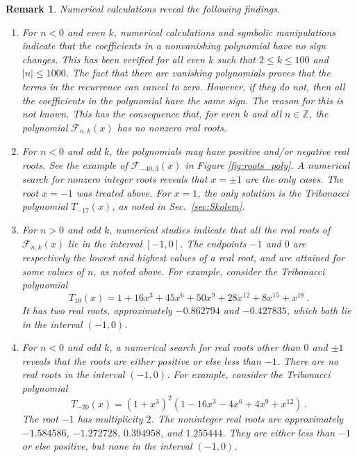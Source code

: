 \documentclass[review]{elsarticle}
\theoremstyle{plain}
\newtheorem{remark}[theorem]{Remark}
\begin{document}
\begin{remark}
  Numerical calculations reveal the following findings.
\begin{enumerate}
\item
  For $n<0$ and even $k$, numerical calculations and symbolic manipulations indicate that the coefficients in a nonvanishing polynomial have no sign changes.
  This has been verified for all even $k$ such that $2 \le k \le 100$ and $|n|\le1000$.
  The fact that there are vanishing polynomials proves that the terms in the recurrence can cancel to zero.
  However, if they do not, then all the coefficients in the polynomial have the same sign.
  The reason for this is not known.  
  This has the consequence that, for even $k$ and all $n\in\mathbb{Z}$, the polynomial $\mathcal{F}_{n,k}(x)$ has no nonzero real roots.
\item
  For $n<0$ and odd $k$, the polynomials may have positive and/or negative real roots.
  See the example of $\mathcal{F}_{-40,3}(x)$ in Figure \ref{fig:roots_poly}.
A numerical search for nonzero integer roots reveals that $x=\pm1$ are the only cases.
The root $x=-1$ was treated above.
For $x=1$, the only solution is the Tribonacci polynomial $T_{-17}(x)$, as noted in Sec.~\ref{sec:Skolem}.
\item
For $n>0$ and odd $k$, numerical studies indicate that
all the real roots of $\mathcal{F}_{n,k}(x)$ lie in the interval $[-1,0]$.
The endpoints $-1$ and $0$ are respectively the lowest and highest values of a real root, and are attained for some values of $n$, as noted above.
For example, consider the Tribonacci polynomial %
\begin{equation}
  T_{10}(x) = 1 +16x^3 +45x^6 +50x^9 +28x^{12} +8x^{15} +x^{18} \,.
\end{equation}
It has two real roots, approximately $-0.862794$ and $-0.427835$, which both lie in the interval $(-1,0)$.

\item
For $n<0$ and odd $k$, a numerical search for real roots other than $0$ and $\pm1$ reveals that 
the roots are either positive or else less than $-1$.
There are no real roots in the interval $(-1,0)$.
For example, consider the Tribonacci polynomial %
\begin{equation}
  T_{-20}(x) = (1+x^3)^2(1 -16x^3 -4x^6 +4x^9 +x^{12}) \,.
\end{equation}
The root $-1$ has multiplicity $2$. The noninteger real roots are approximately
$-1.584586$, $-1.272728$, $0.394958$, and $1.255444$.
They are either less than $-1$ or else positive, but none in the interval $(-1,0)$.


\end{enumerate}
\end{remark}
\end{document}
